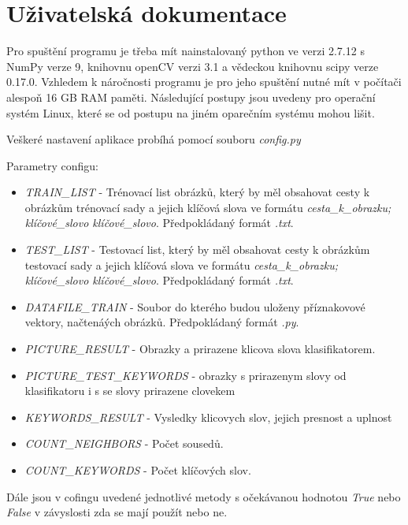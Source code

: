 \documentclass[czech,BP]{thesiskiv}
\begin{document}

{\raggedright\small

}

\appendix
\chapter{Uživatelská dokumentace}
\par Pro spuštění programu je třeba mít nainstalovaný python ve verzi 2.7.12 s NumPy verze 9, knihovnu openCV verzi 3.1 a vědeckou knihovnu scipy verze 0.17.0. Vzhledem k náročnosti programu je pro jeho spuštění nutné mít v počítači alespoň 16 GB RAM paměti. Následující postupy jsou uvedeny pro operační systém Linux, které se od postupu na jiném oparečním systému mohou lišit.

\par Veškeré nastavení aplikace probíhá pomocí souboru \textit{config.py}

\vspace{1cm} 
Parametry configu:
\begin{itemize}
	\item \textit{TRAIN\_LIST} - Trénovací list obrázků, který by měl obsahovat cesty k obrázkům trénovací sady a jejich klíčová slova ve formátu \textit{cesta\_k\_obrazku; klíčové\_slovo klíčové\_slovo}. Předpokládaný formát \textit{.txt}.
	\item \textit{TEST\_LIST} - Testovací list, který by měl obsahovat cesty k obrázkům testovací sady a jejich klíčová slova ve formátu \textit{cesta\_k\_obrazku; klíčové\_slovo klíčové\_slovo}. Předpokládaný formát \textit{.txt}.
	\item \textit{DATAFILE\_TRAIN} - Soubor do kterého budou uloženy příznakovové vektory, načtenáých obrázků. Předpokládaný formát \textit{.py}.
	\item \textit{PICTURE\_RESULT} - Obrazky a prirazene klicova slova klasifikatorem.
	\item \textit{PICTURE\_TEST\_KEYWORDS} - obrazky s prirazenym slovy od klasifikatoru i s se slovy prirazene clovekem
	\item \textit{KEYWORDS\_RESULT} - Vysledky klicovych slov, jejich presnost a uplnost
	\item \textit{COUNT\_NEIGHBORS} - Počet sousedů.
	\item \textit{COUNT\_KEYWORDS} - Počet klíčových slov.
\end{itemize}
Dále jsou v cofingu uvedené jednotlivé metody s očekávanou hodnotou \textit{True} nebo \textit{False} v závyslosti zda se mají použít nebo ne.
\end{document}
